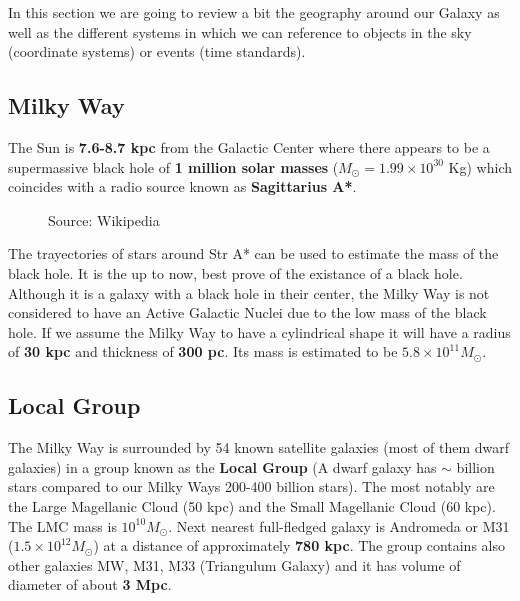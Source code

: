 \documentclass[
  letterpaper,
  DIV=11,
  numbers=noendperiod]{scrreprt}
\begin{document}
In this section we are going to review a bit the geography around our
Galaxy as well as the different systems in which we can reference to
objects in the sky (coordinate systems) or events (time standards).

\subsection{Milky Way}\label{milky-way}

The Sun is \textbf{7.6-8.7 kpc} from the Galactic Center where there
appears to be a supermassive black hole of \textbf{1 million solar
masses} (\(M_{\odot} = 1.99\times 10^{30}\) Kg) which coincides with a
radio source known as \textbf{Sagittarius A*}.

\begin{figure}[H]

{\centering 

}

\caption{Source: Wikipedia}

\end{figure}%

The trayectories of stars around Str A* can be used to estimate the mass
of the black hole. It is the up to now, best prove of the existance of a
black hole. Although it is a galaxy with a black hole in their center,
the Milky Way is not considered to have an Active Galactic Nuclei due to
the low mass of the black hole. If we assume the Milky Way to have a
cylindrical shape it will have a radius of \textbf{30 kpc} and thickness
of \textbf{300 pc}. Its mass is estimated to be
\(5.8 \times 10^{11} M_{\odot}\).

\subsection{Local Group}\label{local-group}

The Milky Way is surrounded by 54 known satellite galaxies (most of them
dwarf galaxies) in a group known as the \textbf{Local Group} (A dwarf
galaxy has \(\sim\) billion stars compared to our Milky Ways 200-400
billion stars). The most notably are the Large Magellanic Cloud (50 kpc)
and the Small Magellanic Cloud (60 kpc). The LMC mass is
\(10^{10} M_{\odot}\). Next nearest full-fledged galaxy is Andromeda or
M31 (\(1.5\times 10^{12} M_{\odot}\)) at a distance of approximately
\textbf{780 kpc}. The group contains also other galaxies MW, M31, M33
(Triangulum Galaxy) and it has volume of diameter of about \textbf{3
Mpc}.
\end{document}
